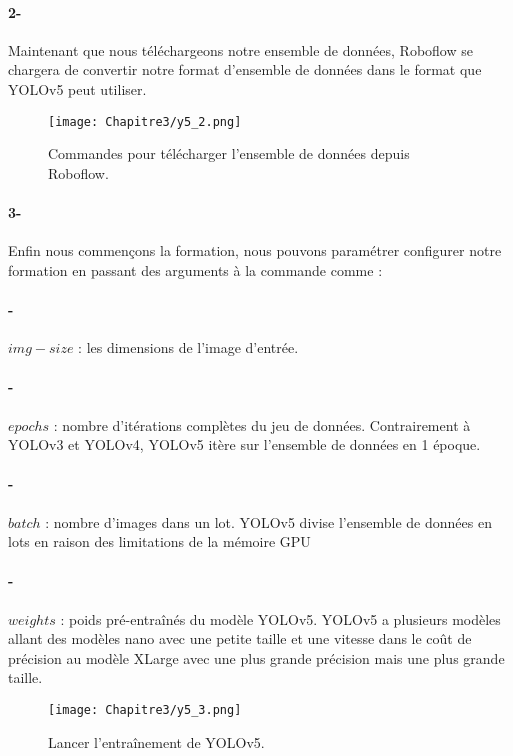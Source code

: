      \paragraph{2-} Maintenant que nous téléchargeons notre ensemble de données, Roboflow se chargera de convertir notre format d'ensemble de données dans le format que YOLOv5 peut utiliser.
     \begin{figure}[H]
               \centering
               \texttt{[image: Chapitre3/y5\_2.png]}
               \caption{Commandes pour télécharger l'ensemble de données depuis Roboflow.}
               \label{y5_2}
               \end{figure}
               
     \paragraph{3-} Enfin nous commençons la formation, nous pouvons paramétrer configurer notre formation en passant des arguments à la commande comme :
     \paragraph{-} $img-size$ : les dimensions de l'image d'entrée.
     \paragraph{-} $epochs$ : nombre d'itérations complètes du jeu de données. Contrairement à YOLOv3 et YOLOv4, YOLOv5 itère sur l'ensemble de données en 1 époque.
     \paragraph{-} $batch$ : nombre d'images dans un lot. YOLOv5 divise l'ensemble de données en lots en raison des limitations de la mémoire GPU
     \paragraph{-} $weights$ : poids pré-entraînés du modèle YOLOv5. YOLOv5 a plusieurs modèles allant des modèles nano avec une petite taille et une vitesse dans le coût de précision au modèle XLarge avec une plus grande précision mais une plus grande taille.
     \begin{figure}[H]
               \centering
               \texttt{[image: Chapitre3/y5\_3.png]}
               \caption{Lancer l'entraînement de YOLOv5.}
               \label{y5_3}
               \end{figure}

